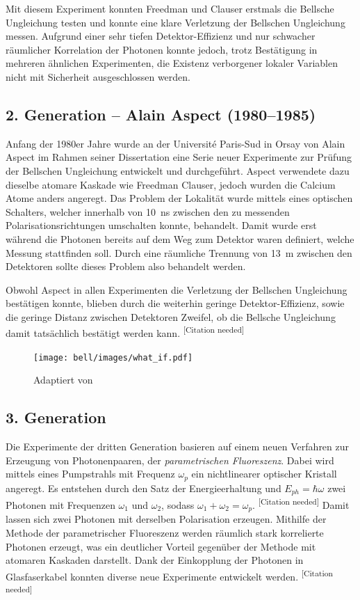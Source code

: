 \begin{refsection}
Mit diesem Experiment konnten Freedman und Clauser erstmals die Bellsche
Ungleichung testen und konnte eine klare Verletzung der Bellschen Ungleichung
messen.
Aufgrund einer sehr tiefen Detektor-Effizienz und nur schwacher r\"aumlicher
Korrelation der Photonen konnte jedoch, trotz Best\"atigung in mehreren 
\"ahnlichen Experimenten, die Existenz verborgener lokaler Variablen nicht
mit Sicherheit ausgeschlossen werden.

\subsection{2. Generation -- Alain Aspect (1980--1985)}
Anfang der 1980er Jahre wurde an der Universit\'e Paris-Sud in Orsay von Alain
Aspect im Rahmen seiner Dissertation eine Serie neuer Experimente zur Pr\"ufung
der Bellschen Ungleichung entwickelt und durchgef\"uhrt. 
Aspect verwendete dazu dieselbe atomare Kaskade wie Freedman Clauser, jedoch
wurden die Calcium Atome anders angeregt. 
Das Problem der Lokalit\"at wurde mittels eines optischen Schalters, welcher 
innerhalb von \SI{10}{\nano\second} zwischen den zu messenden 
Polarisationsrichtungen umschalten konnte, behandelt.
Damit wurde erst w\"ahrend die Photonen bereits auf dem Weg zum Detektor waren
definiert, welche Messung stattfinden soll.
Durch eine r\"aumliche Trennung von \SI{13}{\meter} zwischen den Detektoren
sollte dieses Problem also behandelt werden. 

Obwohl Aspect in allen Experimenten die Verletzung der Bellschen Ungleichung
best\"atigen konnte, blieben durch die weiterhin geringe Detektor-Effizienz,
sowie die geringe Distanz zwischen Detektoren Zweifel, ob die Bellsche
Ungleichung damit tats\"achlich best\"atigt werden kann.
\textsuperscript{[Citation needed]}

\begin{figure}[ht!]
    \centering
    \texttt{[image: bell/images/what\_if.pdf]}
    \caption{Adaptiert von \cite{Bell:XkcdWhatIf}}
\end{figure}
    
\subsection{3. Generation}
Die Experimente der dritten Generation basieren auf einem neuen Verfahren
zur Erzeugung von Photonenpaaren, der \emph{parametrischen Fluoreszenz}.
Dabei wird mittels eines Pumpstrahls mit Frequenz $\omega_p$ ein
nichtlinearer optischer Kristall angeregt.
Es entstehen durch den Satz der Energieerhaltung und $E_{ph}=\hbar \omega$
zwei Photonen mit Frequenzen $\omega_1$ und $\omega_2$, sodass 
$\omega_1 + \omega_2 = \omega_p$. \textsuperscript{[Citation needed]}
Damit lassen sich zwei Photonen mit derselben Polarisation erzeugen.
Mithilfe der Methode der parametrischer Fluoreszenz werden r\"aumlich
stark korrelierte Photonen erzeugt, was ein deutlicher Vorteil
gegen\"uber der Methode mit atomaren Kaskaden darstellt.
Dank der Einkopplung der Photonen in Glasfaserkabel konnten diverse neue
Experimente entwickelt werden. \textsuperscript{[Citation needed]}


\end{refsection}
